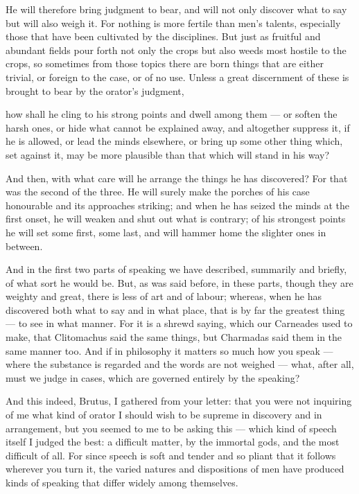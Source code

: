  He will therefore bring judgment to bear, and will not only discover what to say but will also weigh it. For nothing is more fertile than men's talents, especially those that have been cultivated by the disciplines. But just as fruitful and abundant fields pour forth not only the crops but also weeds most hostile to the crops, so sometimes from those topics there are born things that are either trivial, or foreign to the case, or of no use. Unless a great discernment of these is brought to bear by the orator's judgment,

 how shall he cling to his strong points and dwell among them — or soften the harsh ones, or hide what cannot be explained away, and altogether suppress it, if he is allowed, or lead the minds elsewhere, or bring up some other thing which, set against it, may be more plausible than that which will stand in his way?

 And then, with what care will he arrange the things he has discovered? For that was the second of the three. He will surely make the porches of his case honourable and its approaches striking; and when he has seized the minds at the first onset, he will weaken and shut out what is contrary; of his strongest points he will set some first, some last, and will hammer home the slighter ones in between.

 And in the first two parts of speaking we have described, summarily and briefly, of what sort he would be. But, as was said before, in these parts, though they are weighty and great, there is less of art and of labour; whereas, when he has discovered both what to say and in what place, that is by far the greatest thing — to see in what manner. For it is a shrewd saying, which our Carneades used to make, that Clitomachus said the same things, but Charmadas said them in the same manner too. And if in philosophy it matters so much how you speak — where the substance is regarded and the words are not weighed — what, after all, must we judge in cases, which are governed entirely by the speaking?

 And this indeed, Brutus, I gathered from your letter: that you were not inquiring of me what kind of orator I should wish to be supreme in discovery and in arrangement, but you seemed to me to be asking this — which kind of speech itself I judged the best: a difficult matter, by the immortal gods, and the most difficult of all. For since speech is soft and tender and so pliant that it follows wherever you turn it, the varied natures and dispositions of men have produced kinds of speaking that differ widely among themselves.

